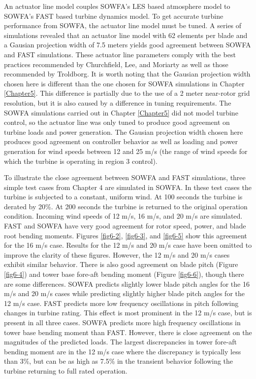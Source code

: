 An actuator line model couples SOWFA's LES based atmosphere model to SOWFA's FAST based turbine dynamics model. To get accurate turbine performance from SOWFA, the actuator line model must be tuned. A series of simulations revealed that an actuator line model with 62 elements per blade and a Gausian projection width of 7.5 meters yields good agreement between SOWFA and FAST simulations. These actuator line parameters comply with the best practices recommended by Churchfield, Lee, and Moriarty \cite{churchfield2012} as well as those recommended by Troldborg.\cite{troldborg2009} It is worth noting that the Gausian projection width chosen here is different than the one chosen for SOWFA simulations in Chapter \ref{Chapter5}. This difference is partially due to the use of a 2 meter near-rotor grid resolution, but it is also caused by a difference in tuning requirements. The SOWFA simulations carried out in Chapter \ref{Chapter5} did not model turbine control, so the actuator line was only tuned to produce good agreement on turbine loads and power generation. The Gausian projection width chosen here produces good agreement on controller behavior as well as loading and power generation for wind speeds between 12 and 25 m/s (the range of wind speeds for which the turbine is operating in region 3 control).

To illustrate the close agreement between SOWFA and FAST simulations, three simple test cases from Chapter 4 are simulated in SOWFA. In these test cases the turbine is subjected to a constant, uniform wind. At 100 seconds the turbine is derated by 20\%. At 200 seconds the turbine is returned to the original operation condition. Incoming wind speeds of 12 m/s, 16 m/s, and 20 m/s are simulated. FAST and SOWFA have very good agreement for rotor speed, power, and blade root bending moments. Figures \ref{fig6-2}, \ref{fig6-3}, and \ref{fig6-5} show this agreement for the 16 m/s case. Results for the 12 m/s and 20 m/s case have been omitted to improve the clarity of these figures. However, the 12 m/s and 20 m/s cases exhibit similar behavior. There is also good agreement on blade pitch (Figure \ref{fig6-4}) and tower base fore-aft bending moment (Figure \ref{fig6-6}), though there are some differences. SOWFA predicts slightly lower blade pitch angles for the 16 m/s and 20 m/s cases while predicting slightly higher blade pitch angles for the 12 m/s case. FAST predicts more low frequency oscillations in pitch following changes in turbine rating. This effect is most prominent in the 12 m/s case, but is present in all three cases. SOWFA predicts more high frequency oscillations in tower base bending moment than FAST. However, there is close agreement on the magnitudes of the predicted loads. The largest discrepancies in tower fore-aft bending moment are in the 12 m/s case where the discrepancy is typically less than 3\%, but can be as high as 7.5\% in the transient behavior following the turbine returning to full rated operation. 

